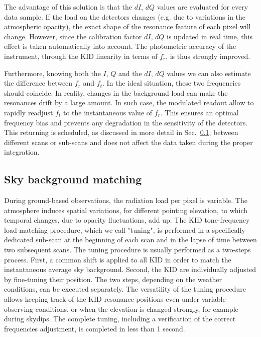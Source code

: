 \documentclass[]{aa} %
\begin{document}
The advantage of this solution is that the $dI$, $dQ$ values are evaluated for every data sample. If the load on the detectors changes (e.g. due to variations in the atmospheric opacity), the exact shape of the resonance feature of each pixel will change. However, since the calibration factor $dI$, $dQ$ is updated in real time, this effect is taken automatically into account. The photometric accuracy of the instrument, through the KID linearity in terms of $f_r$, is thus strongly improved.

Furthermore, knowing both the $I$, $Q$ and the $dI$, $dQ$ values we can also estimate the difference between $f_r$ and $f_t$. In the ideal situation, these two frequencies should coincide. In reality, changes in the background load can make the resonances drift by a large amount. In such case, the modulated readout allow to rapidly readjust $f_t$ to the instantaneous value of $f_r$. This ensures an optimal frequency bias and prevents any degradation in the sensitivity of the detectors. This returning is scheduled, as discussed in more detail in Sec.~\ref{Sky background matching}, between different scans or sub-scans and does not affect the data taken during the proper integration.

\subsection{Sky background matching}
\label{Sky background matching}

During ground-based observations, the radiation load per pixel is variable. The atmosphere induces spatial variations, for different pointing elevation, to which temporal changes, due to opacity fluctuations, add up. The KID tone-frequency load-matching procedure, which we call "tuning", is performed in a specifically dedicated sub-scan at the beginning of each scan and in the lapse of time between two subsequent scans. The tuning procedure is usually performed as a two-steps process. First, a common shift is applied to all KID in order to match the instantaneous average sky background. Second, the KID are individually adjusted by fine-tuning their position. The two steps, depending on the weather conditions, can be executed separately. The versatility of the tuning procedure allows keeping track of the KID resonance positions even under variable observing conditions, or when the elevation is changed strongly, for example during skydips. The complete tuning, including a verification of the correct frequencies adjustment, is completed in less than 1 second. 
\end{document}
